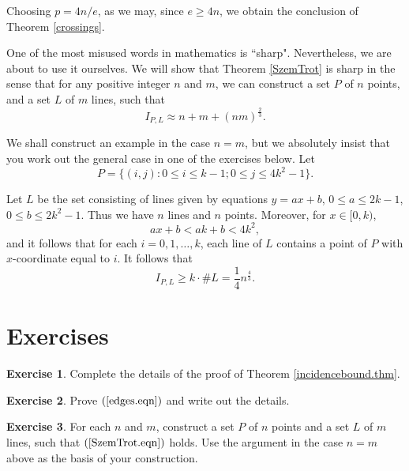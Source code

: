 \documentclass[]{stml-l}
\numberwithin{equation}{chapter}
\theoremstyle{plain}
\theoremstyle{definition}
\newtheorem{exercise}{Exercise}[chapter]
\theoremstyle{remark}
\begin{document}
Choosing $p= 4n/e$, as we may, since $e \ge 4n$, we
obtain the conclusion of Theorem \ref{crossings}.

One of the most misused words in mathematics is ``sharp". Nevertheless,
we are about to use it ourselves. We will show that Theorem \ref{SzemTrot} is sharp
in the sense that for any positive integer $n$ and $m$, we can construct
a set $P$ of $n$ points, and a set $L$ of $m$ lines, such that
\begin{equation} \label{SzemTrot.eqn}
I_{P,L} \approx n+m+{(nm)}^{\frac{2}{3}}.
\end{equation}



We shall construct an example in the case $n=m$, but we absolutely
insist that you work out the general case in one of the exercises below. Let
\begin{equation}
P=\{(i,j): 0 \leq i \leq k-1; 0 \leq j \leq 4k^2-1\}.
\end{equation}



Let $L$ be the set consisting of lines given by equations $y=ax+b$,
$0 \leq a \leq 2k-1$, $0 \leq b \leq 2k^2-1$. Thus we have $n$ lines and
$n$ points. Moreover, for $x \in [0,k)$,
\begin{equation}
ax+b<ak+b<4k^2,
\end{equation}
and it follows that for each $i=0, 1, \dots, k$,
each line of $L$ contains a point of $P$ with
$x$-coordinate equal to $i$. It follows that
\begin{equation}
I_{P,L} \ge k \cdot \# L=\frac{1}{4}n^{\frac{4}{3}}.
\end{equation}


\section*{Exercises}

\begin{exercise} \label{ex3.1}
Complete the details of the proof of Theorem \ref{incidencebound.thm}.
\end{exercise}

\begin{exercise} \label{ex3.2}
Prove $(\ref{edges.eqn})$ and write out the details.
\end{exercise}

\begin{exercise} \label{ex3.3}
For each $n$ and $m$, construct a set $P$
of $n$ points and a set $L$ of $m$ lines, such that $(\ref{SzemTrot.eqn})$ holds. Use
the argument in the case $n=m$ above as the basis of your construction.
\end{exercise}
\end{document}
